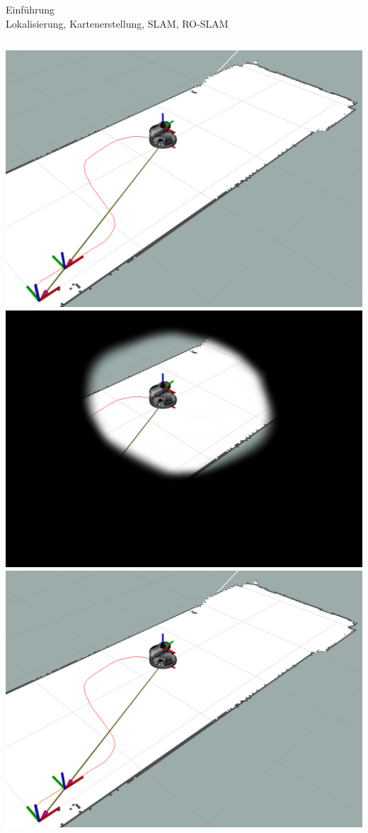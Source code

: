 \documentclass{beamer}
\begin{document}
\begin{frame}{Einführung\\\normalsize{Lokalisierung, Kartenerstellung, SLAM, RO-SLAM}}
	\begin{columns}
		\begin{column}{0.5\linewidth}
			\begin{overlayarea}{\textwidth}{.35\textheight}
				\only<1>
				{
					\includegraphics[width=\linewidth]{intro_localization}
				}
				\only<2>
				{
					\includegraphics[width=\linewidth]{intro_mapping}
				}
				\only<3>
				{
					\includegraphics[width=\linewidth]{intro_localization}
}
\end{overlayarea}
\end{column}
\end{columns}
\end{frame}
\end{document}
